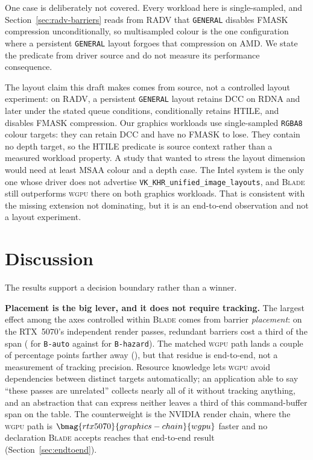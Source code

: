 \documentclass[10pt,twocolumn]{article}
\newcommand{\blade}{\textsc{Blade}}
\newcommand{\wgpu}{\textsc{wgpu}}
\begin{document}
One case is deliberately not covered. Every workload here is single-sampled,
and Section~\ref{sec:radv-barriers} reads from RADV that \texttt{GENERAL}
disables FMASK compression unconditionally, so multisampled colour is the one
configuration where a persistent \texttt{GENERAL} layout forgoes that
compression on AMD. We state the predicate from driver source and do not
measure its performance consequence.

The layout claim this draft makes comes from source, not a controlled layout
experiment: on RADV, a persistent \texttt{GENERAL} layout retains DCC on RDNA
and later under the stated queue conditions, conditionally retains HTILE, and
disables FMASK compression. Our graphics workloads use single-sampled
\texttt{RGBA8} colour targets: they can retain DCC and have no FMASK to lose.
They contain no depth target, so the HTILE predicate is source context rather
than a measured workload property. A study that wanted to stress the layout
dimension would need at least MSAA colour and a depth case. The Intel system is
the only one whose driver does not
advertise \texttt{VK\_KHR\_unified\_image\_layouts}, and \blade{} still
outperforms \wgpu{} there on both graphics workloads. That is
consistent with the missing extension not dominating, but it is an end-to-end
observation and not a layout experiment.

\section{Discussion}
\label{sec:discussion}

The results support a decision boundary rather than a winner.

\textbf{Placement is the big lever, and it does not require tracking.} The
largest effect among the axes controlled within \blade{} comes from barrier
\emph{placement}: on the RTX~5070's independent render passes,
redundant barriers cost a third of the span
( for \texttt{B-auto} against
 for \texttt{B-hazard}). The
matched \wgpu{} path lands a couple of percentage points farther away
(), but that residue is end-to-end,
not a measurement of tracking precision. Resource knowledge lets \wgpu{} avoid
dependencies between distinct targets automatically; an application
able to say ``these passes are unrelated'' collects nearly all of it without
tracking anything, and an abstraction that can express neither leaves a third
of this command-buffer span on the table. The counterweight is the NVIDIA
render chain, where the \wgpu{} path is
$\bmag{rtx5070}{graphics-chain}{wgpu}$ faster and no declaration \blade{}
accepts reaches that end-to-end result (Section~\ref{sec:endtoend}).
\end{document}
